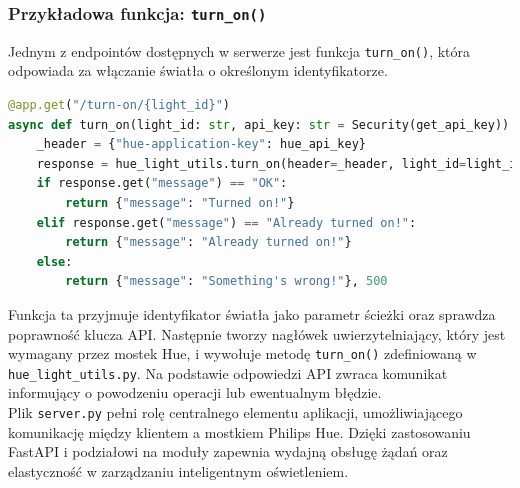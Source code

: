 \documentclass[12pt]{article}
\begin{document}
\subsubsection*{Przykładowa funkcja: \texttt{turn\_on()}}
\noindent Jednym z endpointów dostępnych w serwerze jest funkcja \texttt{turn\_on()}, która odpowiada za włączanie światła o określonym identyfikatorze. 

\begin{lstlisting}[language=Python]
@app.get("/turn-on/{light_id}")
async def turn_on(light_id: str, api_key: str = Security(get_api_key)):
    _header = {"hue-application-key": hue_api_key}
    response = hue_light_utils.turn_on(header=_header, light_id=light_id, bridge_ip=hue_bridge_ip_address)
    if response.get("message") == "OK":
        return {"message": "Turned on!"}
    elif response.get("message") == "Already turned on!":
        return {"message": "Already turned on!"}
    else:
        return {"message": "Something's wrong!"}, 500
\end{lstlisting}
Funkcja ta przyjmuje identyfikator światła jako parametr ścieżki oraz sprawdza poprawność klucza API. Następnie tworzy nagłówek uwierzytelniający, który jest wymagany przez mostek Hue,
i wywołuje metodę \texttt{turn\_on()} zdefiniowaną w \texttt{hue\_light\_utils.py}. Na podstawie odpowiedzi API zwraca komunikat informujący o powodzeniu operacji lub ewentualnym błędzie.\\
Plik \texttt{server.py} pełni rolę centralnego elementu aplikacji, umożliwiającego komunikację między klientem a mostkiem Philips Hue. Dzięki zastosowaniu FastAPI i podziałowi na moduły
zapewnia wydajną obsługę żądań oraz elastyczność w zarządzaniu inteligentnym oświetleniem.
\end{document}
